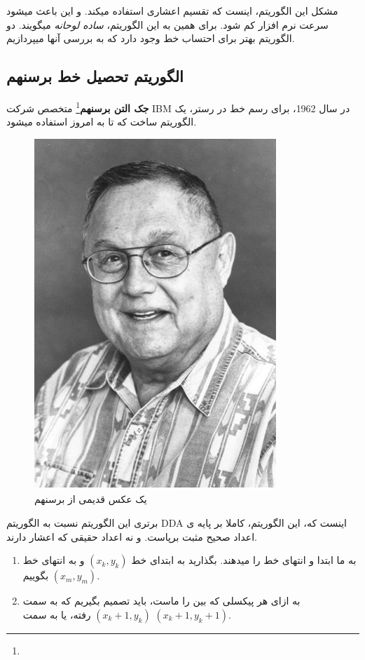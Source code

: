 \documentclass[14pt,a4paper]{memoir}
\begin{document}
	
	
	مشکل این الگوریتم، اینست که تقسیم اعشاری استفاده میکند. و این باعث میشود سرعت نرم افزار کم شود. برای همین به این الگوریتم، \textit{ساده لوحانه} میگویند. دو الگوریتم بهتر برای احتساب خط وجود دارد که به بررسی آنها میپردازیم.
	
	\subsection{الگوریتم تحصیل خط برسنهم}\label{bres}

	\textbf{جک التن برسنهم}\footnote{} متخصص شرکت IBM در سال 1962، برای رسم خط در رستر، یک الگوریتم ساخت که تا به امروز استفاده میشود. 
	
	\begin{figure}[H]
		\centering
		\includegraphics[scale=0.7]{JEB}
		\caption{یک عکس قدیمی از برسنهم}
	\end{figure}

برتری این الگوریتم نسبت به الگوریتم DDA اینست که، این الگوریتم، کاملا بر پایه ی اعداد صحیح مثبت برپاست. و نه اعداد حقیقی  که اعشار دارند. 
	 
	 \begin{enumerate}
	 	\item به ما ابتدا و انتهای خط را میدهند. بگذارید به ابتدای خط $ \left(x_k, y_k\right) $ و به انتهای خط $ \left(x_m, y_m\right) $ بگوییم.
	 	\item به ازای هر پیکسلی که بین را ماست، باید تصمیم بگیریم که به سمت  $ \left(x_k + 1, y_k\right) $ رفته، یا به سمت $ \left(x_k + 1, y_k + 1\right) $.
	 \end{enumerate}
	 
\end{document}
